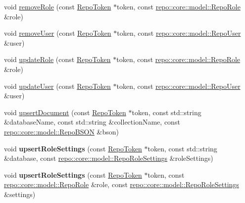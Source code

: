 \begin{DoxyCompactItemize}
\item 
void \hyperlink{class_repo_controller_1_1___repo_controller_impl_a31e89a7217f0234c083730b62036b7b0}{remove\+Role} (const \hyperlink{class_repo_controller_1_1_repo_token}{Repo\+Token} $\ast$token, const \hyperlink{classrepo_1_1core_1_1model_1_1_repo_role}{repo\+::core\+::model\+::\+Repo\+Role} \&role)
\item 
void \hyperlink{class_repo_controller_1_1___repo_controller_impl_a5db323a3e6056220240c61813ff5b762}{remove\+User} (const \hyperlink{class_repo_controller_1_1_repo_token}{Repo\+Token} $\ast$token, const \hyperlink{classrepo_1_1core_1_1model_1_1_repo_user}{repo\+::core\+::model\+::\+Repo\+User} \&user)
\item 
void \hyperlink{class_repo_controller_1_1___repo_controller_impl_aa389a2c23b500a350f0e3530781903f4}{update\+Role} (const \hyperlink{class_repo_controller_1_1_repo_token}{Repo\+Token} $\ast$token, const \hyperlink{classrepo_1_1core_1_1model_1_1_repo_role}{repo\+::core\+::model\+::\+Repo\+Role} \&role)
\item 
void \hyperlink{class_repo_controller_1_1___repo_controller_impl_a12fd59a7cbb6774728545f6ae80749b7}{update\+User} (const \hyperlink{class_repo_controller_1_1_repo_token}{Repo\+Token} $\ast$token, const \hyperlink{classrepo_1_1core_1_1model_1_1_repo_user}{repo\+::core\+::model\+::\+Repo\+User} \&user)
\item 
void \hyperlink{class_repo_controller_1_1___repo_controller_impl_ae50efbdcf4e8be39fccbea81399307cd}{upsert\+Document} (const \hyperlink{class_repo_controller_1_1_repo_token}{Repo\+Token} $\ast$token, const std\+::string \&database\+Name, const std\+::string \&collection\+Name, const \hyperlink{classrepo_1_1core_1_1model_1_1_repo_b_s_o_n}{repo\+::core\+::model\+::\+Repo\+B\+S\+O\+N} \&bson)
\item 
\hypertarget{class_repo_controller_1_1___repo_controller_impl_afaa82c4fe544bc8c29e0a529a01d5818}{}void {\bfseries upsert\+Role\+Settings} (const \hyperlink{class_repo_controller_1_1_repo_token}{Repo\+Token} $\ast$token, const std\+::string \&database, const \hyperlink{classrepo_1_1core_1_1model_1_1_repo_role_settings}{repo\+::core\+::model\+::\+Repo\+Role\+Settings} \&role\+Settings)\label{class_repo_controller_1_1___repo_controller_impl_afaa82c4fe544bc8c29e0a529a01d5818}

\item 
\hypertarget{class_repo_controller_1_1___repo_controller_impl_a8c62230d750b48a1b6493d26e032406f}{}void {\bfseries upsert\+Role\+Settings} (const \hyperlink{class_repo_controller_1_1_repo_token}{Repo\+Token} $\ast$token, const \hyperlink{classrepo_1_1core_1_1model_1_1_repo_role}{repo\+::core\+::model\+::\+Repo\+Role} \&role, const \hyperlink{classrepo_1_1core_1_1model_1_1_repo_role_settings}{repo\+::core\+::model\+::\+Repo\+Role\+Settings} \&settings)\label{class_repo_controller_1_1___repo_controller_impl_a8c62230d750b48a1b6493d26e032406f}


\end{DoxyCompactItemize}
